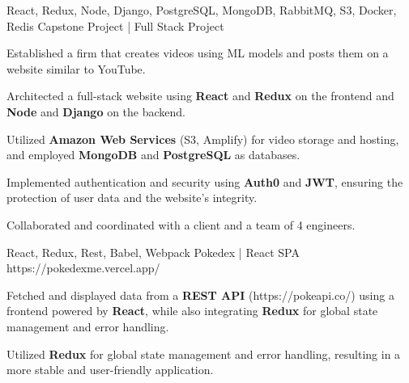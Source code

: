 


\begin{cventries}



\cventry
{React, Redux, Node, Django, PostgreSQL, MongoDB, RabbitMQ, S3, Docker, Redis} %
{Capstone Project | Full Stack Project }  %
{} %
{}
{
	\begin{cvitems} %
		\item {Established a firm that creates videos using ML models and posts them on a website similar to YouTube.}
    \item {Architected a full-stack website using \textbf{React} and \textbf{Redux} on the frontend and \textbf{Node} and \textbf{Django} on the backend.}
    \item {Utilized \textbf{Amazon Web Services} (S3, Amplify) for video storage and hosting, and employed \textbf{MongoDB} and \textbf{PostgreSQL} as databases.}
    \item { Implemented authentication and security using \textbf{Auth0} and \textbf{JWT}, ensuring the protection of user data and the website's integrity.}
		\item {Collaborated and coordinated with a client and a team of 4 engineers.}
	\end{cvitems}
}

\cventry
{React, Redux, Rest, Babel, Webpack } %
{Pokedex | React SPA }  %
{https://pokedexme.vercel.app/ } %
{}
{
	\begin{cvitems} %
		\item {Fetched and displayed data from a \textbf{REST API} (https://pokeapi.co/) using a frontend powered by \textbf{React}, while also integrating \textbf{Redux} for global state management and error handling.}
    \item {Utilized \textbf{Redux} for global state management and error handling, resulting in a more stable and user-friendly application.}
	\end{cvitems}
}


\end{cventries}
